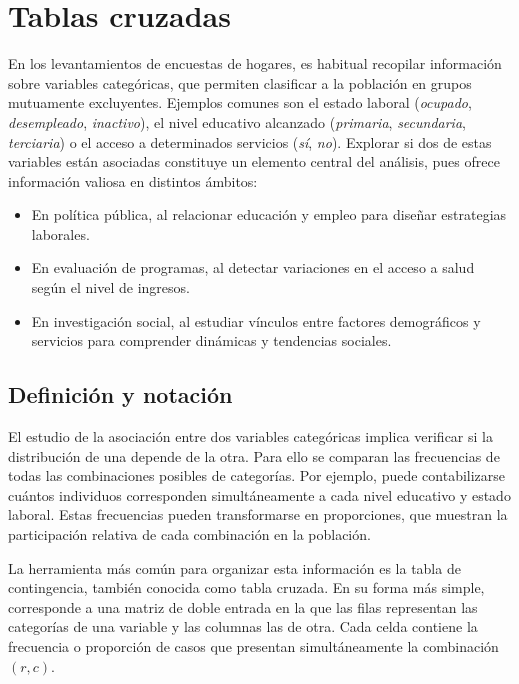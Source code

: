 \documentclass[
  12pt,
]{book}
\providecommand{\tightlist}{%
  \setlength{\itemsep}{0pt}\setlength{\parskip}{0pt}}
\begin{document}
\section{Tablas cruzadas}\label{tablas-cruzadas}

En los levantamientos de encuestas de hogares, es habitual recopilar información sobre variables categóricas, que permiten clasificar a la población en grupos mutuamente excluyentes. Ejemplos comunes son el estado laboral (\emph{ocupado}, \emph{desempleado}, \emph{inactivo}), el nivel educativo alcanzado (\emph{primaria}, \emph{secundaria}, \emph{terciaria}) o el acceso a determinados servicios (\emph{sí}, \emph{no}). Explorar si dos de estas variables están asociadas constituye un elemento central del análisis, pues ofrece información valiosa en distintos ámbitos:

\begin{itemize}
\tightlist
\item
  En política pública, al relacionar educación y empleo para diseñar estrategias laborales.
\item
  En evaluación de programas, al detectar variaciones en el acceso a salud según el nivel de ingresos.
\item
  En investigación social, al estudiar vínculos entre factores demográficos y servicios para comprender dinámicas y tendencias sociales.
\end{itemize}

\subsection{Definición y notación}\label{definiciuxf3n-y-notaciuxf3n}

El estudio de la asociación entre dos variables categóricas implica verificar si la distribución de una depende de la otra. Para ello se comparan las frecuencias de todas las combinaciones posibles de categorías. Por ejemplo, puede contabilizarse cuántos individuos corresponden simultáneamente a cada nivel educativo y estado laboral. Estas frecuencias pueden transformarse en proporciones, que muestran la participación relativa de cada combinación en la población.

La herramienta más común para organizar esta información es la tabla de contingencia, también conocida como tabla cruzada. En su forma más simple, corresponde a una matriz de doble entrada en la que las filas representan las categorías de una variable y las columnas las de otra. Cada celda contiene la frecuencia o proporción de casos que presentan simultáneamente la combinación \((r,c)\).
\end{document}

